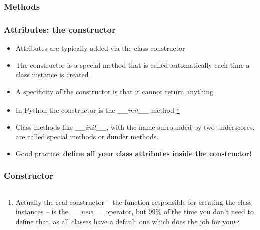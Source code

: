 \documentclass[9pt]{beamer}
\begin{document}
\begin{frame}
  \frametitle{Methods}
  
\end{frame}


%  


%  


\begin{frame}
  \frametitle{Attributes: the constructor}

  \begin{itemize}
    \small
    \item Attributes are typically added via the class \alert{constructor}
    \medskip
    \item The constructor is a special method that is called automatically each time
          a class instance is created
    \medskip
    \item A specificity of the constructor is that it cannot return anything
    \medskip
    \item In Python the constructor is the \emph{\_\_init\_\_} method%
          \footnote{Actually the real constructor -- the function responsible for
                    creating the class instances -- is the \emph{\_\_new\_\_} operator, but 99\% of the time you don't need
                    to define that, as all classes have a default one which does the job for you}
    \medskip
    \item Class methods like \emph{\_\_init\_\_}, with the name surrounded by two underscores,
          are called \alert{special} methods or \alert{dunder} methods.
    \medskip
    \item Good practice: \textbf{define all your class attributes inside the constructor!}

  \end{itemize}

\end{frame}


\begin{frame}
  \frametitle{Constructor}
  
\end{frame}
\end{document}
